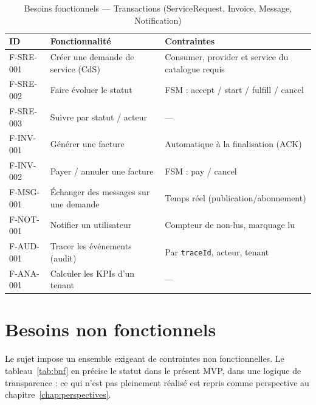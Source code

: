 \begin{table}[H]
\centering
\caption{Besoins fonctionnels --- Transactions (ServiceRequest, Invoice, Message, Notification)}
\label{tab:bf-facturation}
\renewcommand{\arraystretch}{1.25}\footnotesize
\begin{tabularx}{\linewidth}{L{2cm} L{4.6cm} X}
\toprule
\textbf{ID} & \textbf{Fonctionnalité} & \textbf{Contraintes} \\
\midrule
F-SRE-001 & Créer une demande de service (CdS) & Consumer, provider et service du catalogue requis \\
F-SRE-002 & Faire évoluer le statut & FSM : accept / start / fulfill / cancel \\
F-SRE-003 & Suivre par statut / acteur & --- \\
F-INV-001 & Générer une facture & Automatique à la finalisation (ACK) \\
F-INV-002 & Payer / annuler une facture & FSM : pay / cancel \\
F-MSG-001 & Échanger des messages sur une demande & Temps réel (publication/abonnement) \\
F-NOT-001 & Notifier un utilisateur & Compteur de non-lus, marquage lu \\
F-AUD-001 & Tracer les événements (audit) & Par \texttt{traceId}, acteur, tenant \\
F-ANA-001 & Calculer les KPIs d'un tenant & --- \\
\bottomrule
\end{tabularx}
\end{table}

\section{Besoins non fonctionnels}

Le sujet impose un ensemble exigeant de contraintes non fonctionnelles. Le
tableau~\ref{tab:bnf} en précise le statut dans le présent MVP, dans une logique de
transparence : ce qui n'est pas pleinement réalisé est repris comme perspective au
chapitre~\ref{chap:perspectives}.

